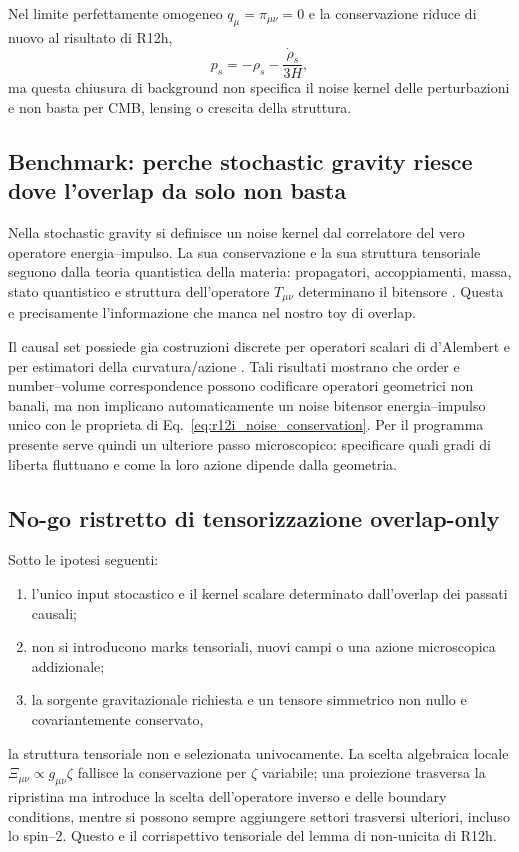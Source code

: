 \documentclass[11pt,a4paper]{article}
\begin{document}
Nel limite perfettamente omogeneo $q_\mu=\pi_{\mu\nu}=0$ e la conservazione riduce di nuovo al risultato di R12h,
\begin{equation}
 p_s=-\rho_s-\frac{\dot\rho_s}{3H},
\end{equation}
ma questa chiusura di background non specifica il noise kernel delle perturbazioni e non basta per CMB, lensing o crescita della struttura.

\subsection{Benchmark: perche stochastic gravity riesce dove l'overlap da solo non basta}

Nella stochastic gravity si definisce un noise kernel dal correlatore del vero operatore energia--impulso. La sua conservazione e la sua struttura tensoriale seguono dalla teoria quantistica della materia: propagatori, accoppiamenti, massa, stato quantistico e struttura dell'operatore $T_{\mu\nu}$ determinano il bitensore \cite{HuVerdaguer2008}. Questa e precisamente l'informazione che manca nel nostro toy di overlap.

Il causal set possiede gia costruzioni discrete per operatori scalari di d'Alembert e per estimatori della curvatura/azione \cite{BenincasaDowker2010,DowkerGlaser2013}. Tali risultati mostrano che order e number--volume correspondence possono codificare operatori geometrici non banali, ma non implicano automaticamente un noise bitensor energia--impulso unico con le proprieta di Eq.~\eqref{eq:r12i_noise_conservation}. Per il programma presente serve quindi un ulteriore passo microscopico: specificare quali gradi di liberta fluttuano e come la loro azione dipende dalla geometria.

\subsection{No-go ristretto di tensorizzazione overlap-only}

Sotto le ipotesi seguenti:
\begin{enumerate}[label=(\roman*)]
 \item l'unico input stocastico e il kernel scalare determinato dall'overlap dei passati causali;
 \item non si introducono marks tensoriali, nuovi campi o una azione microscopica addizionale;
 \item la sorgente gravitazionale richiesta e un tensore simmetrico non nullo e covariantemente conservato,
\end{enumerate}
la struttura tensoriale non e selezionata univocamente. La scelta algebraica locale $\Xi_{\mu\nu}\propto g_{\mu\nu}\zeta$ fallisce la conservazione per $\zeta$ variabile; una proiezione trasversa la ripristina ma introduce la scelta dell'operatore inverso e delle boundary conditions, mentre si possono sempre aggiungere settori trasversi ulteriori, incluso lo spin--2. Questo e il corrispettivo tensoriale del lemma di non-unicita di R12h.
\end{document}
